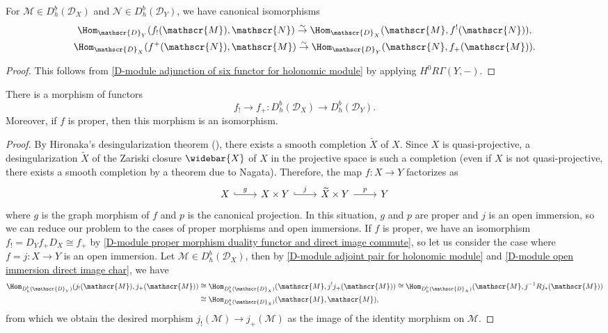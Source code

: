 \begin{corollary}\label{D-module adjoint pair for holonomic module}
For $\mathscr{M}\in D_h^b(\mathscr{D}_X)$ and $\mathscr{N}\in D^b_h(\mathscr{D}_Y)$, we have canonical isomorphisms
\begin{gather*}
\Hom_{\mathscr{D}_Y}(f_!(\mathscr{M}),\mathscr{N})\stackrel{\sim}{\to} \Hom_{\mathscr{D}_X}(\mathscr{M},f^!(\mathscr{N})),\\
\Hom_{\mathscr{D}_X}(f^+(\mathscr{N}),\mathscr{M})\stackrel{\sim}{\to} \Hom_{\mathscr{D}_Y}(\mathscr{N},f_+(\mathscr{M})).
\end{gather*}
\end{corollary}
\begin{proof}
This follows from \cref{D-module adjunction of six functor for holonomic module} by applying $H^0R\Gamma(Y,-)$.
\end{proof}

\begin{theorem}\label{D-module holonomic morphism f_! to f_+}
There is a morphism of functors
\[f_!\to f_+:D^b_h(\mathscr{D}_X)\to D_h^b(\mathscr{D}_Y).\]
Moreover, if $f$ is proper, then this morphism is an isomorphism.
\end{theorem}
\begin{proof}
By Hironaka's desingularization theorem (\cite{Hi}), there exists a smooth completion $\widetilde{X}$ of $X$. Since $X$ is quasi-projective, a desingularization $\widetilde{X}$ of the Zariski closure $\widebar{X}$ of $X$ in the projective space is such a completion (even if $X$ is not quasi-projective, there exists a smooth completion by a theorem due to Nagata). Therefore, the map $f:X\to Y$ factorizes as
\[\begin{tikzcd}
X\ar[r,hook,"g"]&X\times Y\ar[r,hook,"j"]&\widetilde{X}\times Y\ar[r,"p"]&Y
\end{tikzcd}\]
where $g$ is the graph morphism of $f$ and $p$ is the canonical projection. In this situation, $g$ and $p$ are proper and $j$ is an open immersion, so we can reduce our problem to the cases of proper morphisms and open immersions. If $f$ is proper, we have an isomorphism $f_!=D_Yf_+D_X\cong f_+$ by \cref{D-module proper morphism duality functor and direct image commute}, so let us consider the case where $f=j:X\to Y$ is an open immersion. Let $\mathscr{M}\in D^b_h(\mathscr{D}_X)$, then by \cref{D-module adjoint pair for holonomic module} and \cref{D-module open immersion direct image char}, we have
\begin{align*}
\Hom_{D^b_h(\mathscr{D}_Y)}(j_!(\mathscr{M}),j_+(\mathscr{M}))&\cong \Hom_{D^b_h(\mathscr{D}_X)}(\mathscr{M},j^!j_+(\mathscr{M}))\cong \Hom_{D^b_h(\mathscr{D}_X)}(\mathscr{M},j^{-1}Rj_*(\mathscr{M}))\\
&\cong \Hom_{D^b_h(\mathscr{D}_X)}(\mathscr{M},\mathscr{M}),
\end{align*}
from which we obtain the desired morphism $j_!(\mathscr{M})\to j_+(\mathscr{M})$ as the image of the identity morphism on $\mathscr{M}$.
\end{proof}

